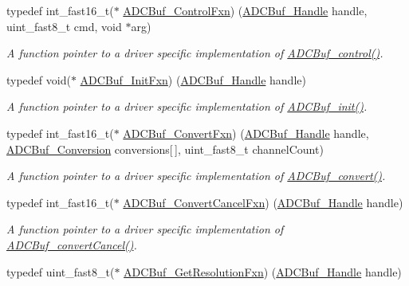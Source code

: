 \begin{DoxyCompactItemize}
typedef int\+\_\+fast16\+\_\+t($\ast$ \hyperlink{_a_d_c_buf_8h_a24f4127b82e138fa18c8a54b4d914e05}{A\+D\+C\+Buf\+\_\+\+Control\+Fxn}) (\hyperlink{_a_d_c_buf_8h_a9b9646efcf7a7fd38a2935abd940cf96}{A\+D\+C\+Buf\+\_\+\+Handle} handle, uint\+\_\+fast8\+\_\+t cmd, void $\ast$arg)
\begin{DoxyCompactList}\small\item\em A function pointer to a driver specific implementation of \hyperlink{_a_d_c_buf_8h_a9b9765fb0ac57dee9df234a79dcd5aea}{A\+D\+C\+Buf\+\_\+control()}. \end{DoxyCompactList}\item 
typedef void($\ast$ \hyperlink{_a_d_c_buf_8h_ab63b9bc37ab6f5fa2521c18b38c1881e}{A\+D\+C\+Buf\+\_\+\+Init\+Fxn}) (\hyperlink{_a_d_c_buf_8h_a9b9646efcf7a7fd38a2935abd940cf96}{A\+D\+C\+Buf\+\_\+\+Handle} handle)
\begin{DoxyCompactList}\small\item\em A function pointer to a driver specific implementation of \hyperlink{_a_d_c_buf_8h_a88a0ab421304465b22417a7adef6c0c2}{A\+D\+C\+Buf\+\_\+init()}. \end{DoxyCompactList}\item 
typedef int\+\_\+fast16\+\_\+t($\ast$ \hyperlink{_a_d_c_buf_8h_a57f40a75d77241e2fda473f0538e404d}{A\+D\+C\+Buf\+\_\+\+Convert\+Fxn}) (\hyperlink{_a_d_c_buf_8h_a9b9646efcf7a7fd38a2935abd940cf96}{A\+D\+C\+Buf\+\_\+\+Handle} handle, \hyperlink{struct_a_d_c_buf___conversion}{A\+D\+C\+Buf\+\_\+\+Conversion} conversions\mbox{[}$\,$\mbox{]}, uint\+\_\+fast8\+\_\+t channel\+Count)
\begin{DoxyCompactList}\small\item\em A function pointer to a driver specific implementation of \hyperlink{_a_d_c_buf_8h_a762253a94875258c5a71b591f03f9d97}{A\+D\+C\+Buf\+\_\+convert()}. \end{DoxyCompactList}\item 
typedef int\+\_\+fast16\+\_\+t($\ast$ \hyperlink{_a_d_c_buf_8h_a88bb1333e07a3fee27926064058d5d1b}{A\+D\+C\+Buf\+\_\+\+Convert\+Cancel\+Fxn}) (\hyperlink{_a_d_c_buf_8h_a9b9646efcf7a7fd38a2935abd940cf96}{A\+D\+C\+Buf\+\_\+\+Handle} handle)
\begin{DoxyCompactList}\small\item\em A function pointer to a driver specific implementation of \hyperlink{_a_d_c_buf_8h_a5201c27bddf11b9f9ae902807bded40d}{A\+D\+C\+Buf\+\_\+convert\+Cancel()}. \end{DoxyCompactList}\item 
typedef uint\+\_\+fast8\+\_\+t($\ast$ \hyperlink{_a_d_c_buf_8h_aeff0bfa20eb16c3857b5123da136d320}{A\+D\+C\+Buf\+\_\+\+Get\+Resolution\+Fxn}) (\hyperlink{_a_d_c_buf_8h_a9b9646efcf7a7fd38a2935abd940cf96}{A\+D\+C\+Buf\+\_\+\+Handle} handle)

\end{DoxyCompactItemize}
